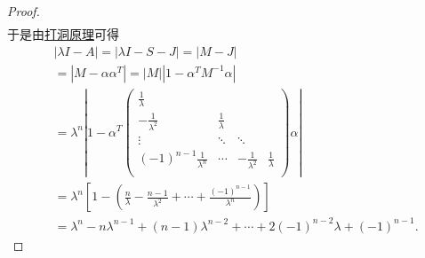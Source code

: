 \documentclass[../../main.tex]{subfiles}%
\begin{document}
\begin{proof}
\begin{align*}
\end{align*}
于是由\hyperref[proposition:打洞原理]{打洞原理}可得
\begin{align*}
&\left| \lambda I-A \right|=\left| \lambda I-S-J \right|=\left| M-J \right|
\\
&=\left| M-\alpha \alpha ^T \right|=\left| M \right|\left| 1-\alpha ^TM^{-1}\alpha \right|
\\
&=\lambda^n\left| 1-\alpha ^T\left( \begin{matrix}
\frac{1}{\lambda}&		&		&		\\
-\frac{1}{\lambda^2}&		\frac{1}{\lambda}&		&		\\
\vdots&		\ddots&		\ddots&		\\
(-1)^{n-1}\frac{1}{\lambda^n}&		\cdots&		-\frac{1}{\lambda^2}&		\frac{1}{\lambda}\\
\end{matrix} \right) \alpha \right|
\\
&=\lambda^n\left[ 1-\left( \frac{n}{\lambda}-\frac{n-1}{\lambda^2}+\cdots +\frac{\left( -1 \right) ^{n-1}}{\lambda^n} \right) \right] 
\\
&=\lambda^n-n\lambda^{n-1}+\left( n-1 \right) \lambda^{n-2}+\cdots +2\left( -1 \right) ^{n-2}\lambda+\left( -1 \right) ^{n-1}.
\end{align*}

\end{proof}
\end{document}
